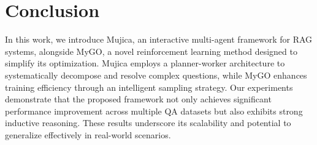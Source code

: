 \section{Conclusion}
In this work, we introduce Mujica, an interactive multi-agent framework for RAG systems, alongside MyGO, a novel reinforcement learning method designed to simplify its optimization.
Mujica employs a planner-worker architecture to systematically decompose and resolve complex questions, while MyGO enhances training efficiency through an intelligent sampling strategy.
Our experiments demonstrate that the proposed framework not only achieves significant performance improvement across multiple QA datasets but also exhibits strong inductive reasoning.
These results underscore its scalability and potential to generalize effectively in real-world scenarios.

\newpage